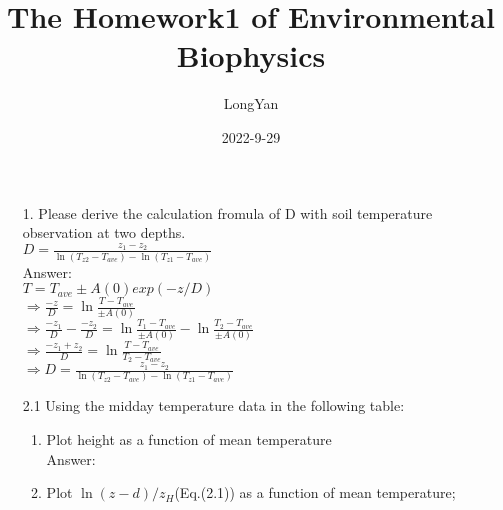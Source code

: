 \documentclass{article}
\title{The Homework1 of Environmental Biophysics}
\author{LongYan}
\date{2022-9-29}
\begin{document}
\maketitle
\begin{enumerate}
    \item[1.] 
    Please derive the calculation fromula of D with soil temperature observation at two depths.\\
    $D=\frac{z_{1}-z_{2}}{\ln{(T_{z2}-T_{ave})}-\ln{(T_{z1}-T_{ave})}}$\\
    Answer:\\$T = T_{ave} \pm A(0)exp(-z/D)$\\
    $\Rightarrow \frac{-z}{D} = \ln\frac{T-T_{ave}}{\pm A(0)}$\\ 
    $\Rightarrow \frac{-z_{1}}{D} - \frac{-z_{2}}{D} = \ln\frac{T_{1}-T_{ave}}{\pm A(0)} - \ln\frac{T_{2}-T_{ave}}{\pm A(0)}$\\
    $\Rightarrow \frac{-z_{1}+z_{2}}{D} = \ln\frac{T-T_{ave}}{T_{2}-T_{ave}}$\\
    $\Rightarrow D=\frac{z_{1}-z_{2}}{\ln{(T_{z2}-T_{ave})}-\ln{(T_{z1}-T_{ave})}}$\\
    \item[2.1]  Using the midday temperature data in the following table:
    \begin{enumerate}
        \item 
        Plot height as a function of mean temperature\\
        Answer:
        \item 
        Plot $\ln{(z-d)/z_{H}}$(Eq.(2.1)) as a function of mean temperature;
    \end{enumerate}
\end{enumerate}
\end{document}
